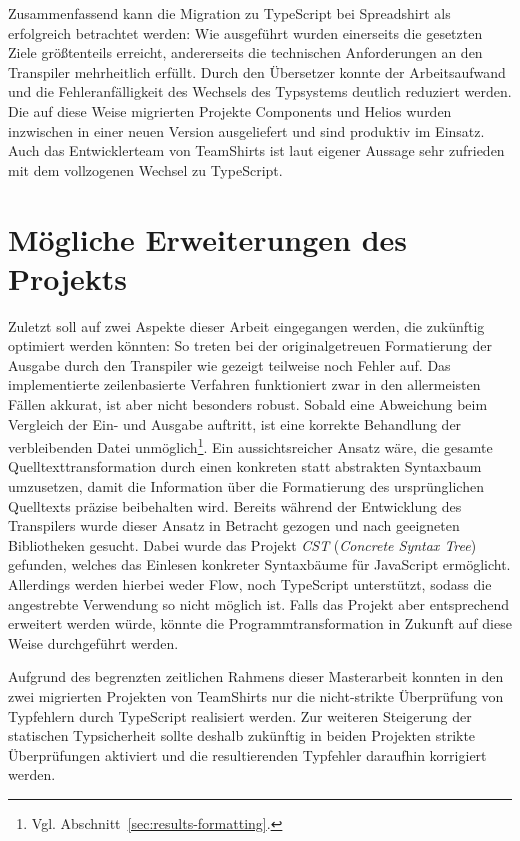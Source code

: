 Zusammenfassend kann die Migration zu TypeScript bei Spreadshirt als erfolgreich betrachtet werden: Wie ausgeführt wurden einerseits die gesetzten Ziele größtenteils erreicht, andererseits die technischen Anforderungen an den Transpiler mehrheitlich erfüllt. Durch den Übersetzer konnte der Arbeitsaufwand und die Fehleranfälligkeit des Wechsels des Typsystems deutlich reduziert werden. Die auf diese Weise migrierten Projekte Components und Helios wurden inzwischen in einer neuen Version ausgeliefert und sind produktiv im Einsatz. Auch das Entwicklerteam von TeamShirts ist laut eigener Aussage sehr zufrieden mit dem vollzogenen Wechsel zu TypeScript.

\section{Mögliche Erweiterungen des Projekts}

Zuletzt soll auf zwei Aspekte dieser Arbeit eingegangen werden, die zukünftig optimiert werden könnten: So treten bei der originalgetreuen Formatierung der Ausgabe durch den Transpiler wie gezeigt teilweise noch Fehler auf. Das implementierte zeilenbasierte Verfahren funktioniert zwar in den allermeisten Fällen akkurat, ist aber nicht besonders robust. Sobald eine Abweichung beim Vergleich der Ein- und Ausgabe auftritt, ist eine korrekte Behandlung der verbleibenden Datei unmöglich\footnote{Vgl. Abschnitt~\ref{sec:results-formatting}.}. Ein aussichtsreicher Ansatz wäre, die gesamte Quelltexttransformation durch einen konkreten statt abstrakten Syntaxbaum umzusetzen, damit die Information über die Formatierung des ursprünglichen Quelltexts präzise beibehalten wird. Bereits während der Entwicklung des Transpilers wurde dieser Ansatz in Betracht gezogen und nach geeigneten Bibliotheken gesucht. Dabei wurde das Projekt \textit{CST} (\textit{Concrete Syntax Tree})~\autocite{SOFTWARE:CST} gefunden, welches das Einlesen konkreter Syntaxbäume für JavaScript ermöglicht. Allerdings werden hierbei weder Flow, noch TypeScript unterstützt, sodass die angestrebte Verwendung so nicht möglich ist. Falls das Projekt aber entsprechend erweitert werden würde, könnte die Programmtransformation in Zukunft auf diese Weise durchgeführt werden.

Aufgrund des begrenzten zeitlichen Rahmens dieser Masterarbeit konnten in den zwei migrierten Projekten von TeamShirts nur die nicht-strikte Überprüfung von Typfehlern durch TypeScript realisiert werden. Zur weiteren Steigerung der statischen Typsicherheit sollte deshalb zukünftig in beiden Projekten strikte Überprüfungen aktiviert und die resultierenden Typfehler daraufhin korrigiert werden.
